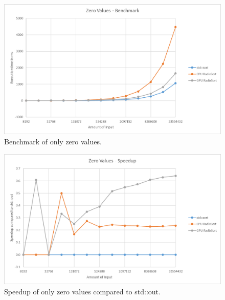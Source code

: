 \documentclass{llncs}
\begin{document}




\begin{figure}
  \begin{center}
    \includegraphics[width=\columnwidth]{charts/zero_benchmark.png}
  \end{center}
  \caption{Benchmark of only zero values.}\label{fig:zero_bench}
\end{figure}

\begin{figure}
  \begin{center}
    \includegraphics[width=\columnwidth]{charts/zero_speedup.png}
  \end{center}
  \caption{Speedup of only zero values compared to std::out.}\label{fig:zero_speedup}
\end{figure}
\end{document}
